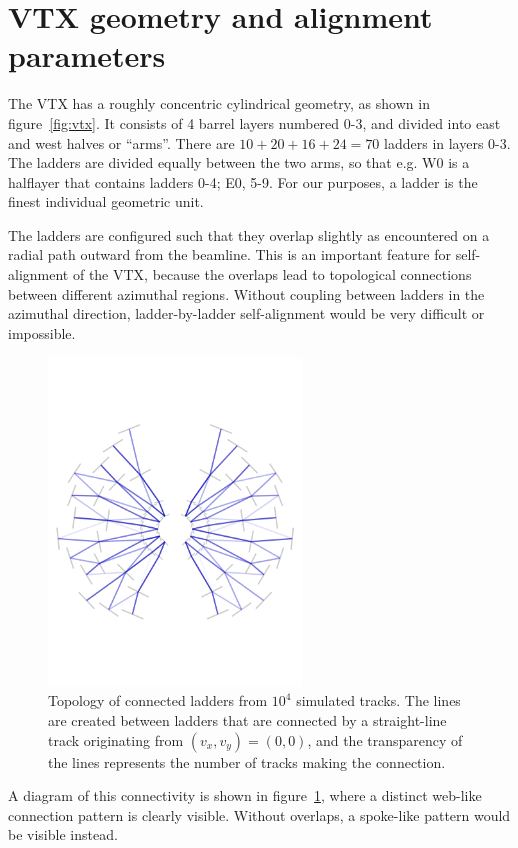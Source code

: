 \documentclass[12pt]{article}
\begin{document}
\section{VTX geometry and alignment parameters}
The VTX has a roughly concentric cylindrical geometry, as shown in figure~\ref{fig:vtx}. It consists of 4 barrel layers numbered 0-3, and divided into east and west halves or ``arms''. There are $10+20+16+24 = 70$ ladders in layers 0-3. The ladders are divided equally between the two arms, so that e.g. W0 is a halflayer that contains ladders 0-4; E0, 5-9. For our purposes, a ladder is the finest individual geometric unit.

The ladders are configured such that they overlap slightly as encountered on a radial path outward from the beamline. This is an important feature for self-alignment of the VTX, because the overlaps lead to topological connections between different azimuthal regions. Without coupling between ladders in the azimuthal direction, ladder-by-ladder self-alignment would be very difficult or impossible. 
\vspace{-2cm}
\begin{figure}
\centering
\includegraphics[width=0.6\textwidth]{topology}
\caption{Topology of connected ladders from $10^4$ simulated tracks. The lines are created between ladders that are connected by a straight-line track originating from $(v_x, v_y) = (0,0)$, and the transparency of the lines represents the number of tracks making the connection.}
\label{fig:topo}
\end{figure}
\vspace{-2cm}
A diagram of this connectivity is shown in figure~\ref{fig:topo}, where a distinct web-like connection pattern is clearly visible. Without overlaps, a spoke-like pattern would be visible instead.
\end{document}
